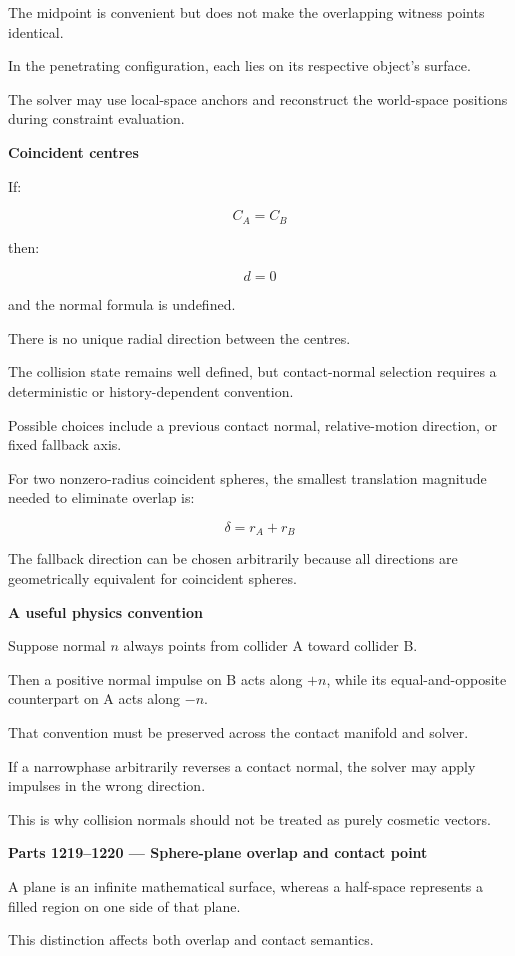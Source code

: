 The midpoint is convenient but does not make the overlapping witness points identical.

In the penetrating configuration, each lies on its respective object's surface.

The solver may use local-space anchors and reconstruct the world-space positions during constraint evaluation.

\textbf{Coincident centres}

If:

\[
C_A=C_B
\]

then:

\[
d=0
\]

and the normal formula is undefined.

There is no unique radial direction between the centres.

The collision state remains well defined, but contact-normal selection requires a deterministic or history-dependent convention.

Possible choices include a previous contact normal, relative-motion direction, or fixed fallback axis.

For two nonzero-radius coincident spheres, the smallest translation magnitude needed to eliminate overlap is:

\[
\delta=r_A+r_B
\]

The fallback direction can be chosen arbitrarily because all directions are geometrically equivalent for coincident spheres.

\textbf{A useful physics convention}

Suppose normal \(n\) always points from collider A toward collider B.

Then a positive normal impulse on B acts along \(+n\), while its equal-and-opposite counterpart on A acts along \(-n\).

That convention must be preserved across the contact manifold and solver.

If a narrowphase arbitrarily reverses a contact normal, the solver may apply impulses in the wrong direction.

This is why collision normals should not be treated as purely cosmetic vectors.

\textbf{Parts 1219--1220 --- Sphere-plane overlap and contact point}

A plane is an infinite mathematical surface, whereas a half-space represents a filled region on one side of that plane.

This distinction affects both overlap and contact semantics.

